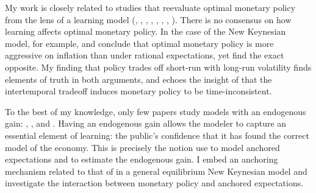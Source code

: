 \documentclass[11pt]{article}
\renewcommand{\[}{\begin{equation}}
\renewcommand{\]}{\end{equation}}
\begin{document}
%

My work is closely related to studies that reevaluate optimal monetary policy from the lens of a learning model (\cite{orphanides2005decline}, \cite{gaspar2006adaptive}, \cite{evans2006monetary}, \cite{ferrero2007monetary}, \cite{PRESTON2008}, \cite{molnar2014optimal}, \cite{eusepi2018science}, \cite{eusepi2018limits}). There is no consensus on how learning affects optimal monetary policy. In the case of the New Keynesian model, for example, \cite{eusepi2018science} and \cite{molnar2014optimal} conclude that optimal monetary policy is more aggressive on inflation than under rational expectations, yet \cite{eusepi2018limits} find the exact opposite. My finding that policy trades off short-run with long-run volatility finds elements of truth in both arguments, and echoes the insight of \cite{LUBIK201685} that the intertemporal tradeoff induces monetary policy to be time-inconsistent.

To the best of my knowledge, only few papers study models with an endogenous gain: \cite{marcet2003recurrent}, \cite{milani2014learning}, and \cite{carvalho2019anchored}. Having an endogenous gain allows the modeler to capture an essential element of learning: the public's confidence that it has found the correct model of the economy. This is precisely the notion \cite{carvalho2019anchored} use to model anchored expectations and to estimate the endogenous gain. I embed an anchoring mechanism related to that of \cite{carvalho2019anchored} in a general equilibrium New Keynesian model and investigate the interaction between monetary policy and anchored expectations.
\end{document}
